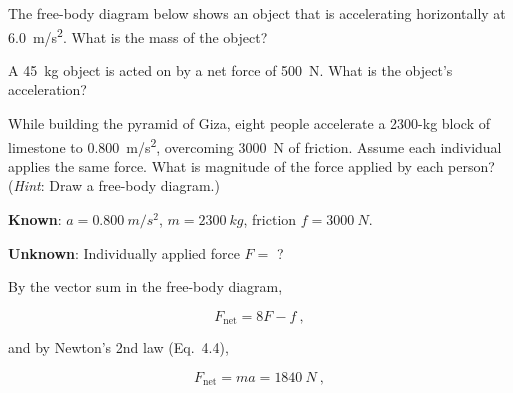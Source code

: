 \documentclass{exam}
\begin{document}
\begin{questions}
\clearpage
\question
The free-body diagram below shows an object that is accelerating horizontally at \SI{6.0}{m/s^2}. What is the mass of the object?

\begin{figure}[h!]
\centering
{}
\end{figure}

\question
A \SI{45}{kg} object is acted on by a net force of \SI{500}{N}. What is the object's acceleration?

\question
While building the pyramid of Giza, eight people accelerate a 2300-kg block of limestone to \SI{0.800}{m/s^2}, overcoming \SI{3000}{N} of friction. Assume each individual applies the same force. What is magnitude of the force applied by each person? (\textit{Hint}: Draw a free-body diagram.)

\begin{solution}
\vspace{1em}

\textbf{Known}: $a = \SI{0.800}{m/s^2}$, $m = \SI{2300}{kg}$, friction $f = \SI{3000}{N}$. 

\textbf{Unknown}: Individually applied force $F =$ ?

\vspace{1em}

By the vector sum in the free-body diagram,

\begin{equation*}
    F_{\mathrm{net}} = 8F - f\ ,
\end{equation*}

and by Newton's 2nd law (Eq.~4.4),

\begin{equation*}
    F_{\mathrm{net}} = m a = \SI{1840}{N}\ ,
\end{equation*}


\end{solution}
\end{questions}
\end{document}
